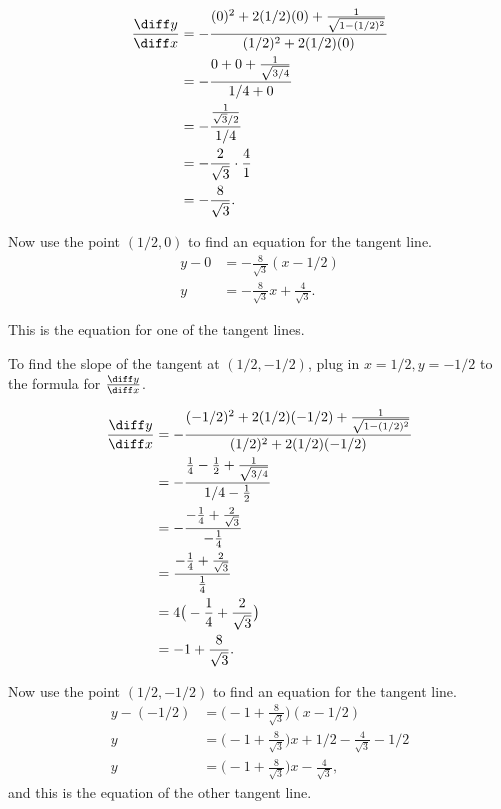 \begin{enumerate}
{\begin{align*}
\frac{\diff y}{\diff x} & = -\frac{(0)^2+2(1/2)(0) + \frac{1}{\sqrt{1-(1/2)^2}}}{(1/2)^2+2(1/2)(0)} \\
& = -\frac{0+0+\frac{1}{\sqrt{3/4}}}{1/4 + 0} \\
& = -\frac{\frac{1}{\sqrt{3}/2}}{1/4} \\
& = -\frac{2}{\sqrt{3}}\cdot \frac{4}{1} \\
& = -\frac{8}{\sqrt{3}}.
\end{align*}

Now use the point $(1/2,0)$ to find an equation for the tangent line.  
\begin{align*}
y - 0 & = -\frac{8}{\sqrt{3}}(x-1/2) \\
y & = -\frac{8}{\sqrt{3}}x +\frac{4}{\sqrt{3}}.
\end{align*}

This is the equation for one of the tangent lines.  

To find the slope of the tangent at $(1/2,-1/2)$, plug in $x=1/2,y=-1/2$ to the formula for $\frac{\diff y}{\diff x}$.  

\begin{align*}
\frac{\diff y}{\diff x} & = -\frac{(-1/2)^2+2(1/2)(-1/2) + \frac{1}{\sqrt{1-(1/2)^2}}}{(1/2)^2+2(1/2)(-1/2)} \\
& = -\frac{\frac{1}{4}-\frac{1}{2}+\frac{1}{\sqrt{3/4}}}{1/4 -\frac{1}{2}} \\
& = -\frac{-\frac{1}{4}+\frac{2}{\sqrt{3}}}{-\frac{1}{4}} \\
& = \frac{-\frac{1}{4}+\frac{2}{\sqrt{3}}}{\frac{1}{4}} \\
& = 4\big(-\frac{1}{4}+\frac{2}{\sqrt{3}}\big) \\
& = -1 + \frac{8}{\sqrt{3}}.
\end{align*}

Now use the point $(1/2,-1/2)$ to find an equation for the tangent line.  
\begin{align*}
y - (-1/2) & = \Big(-1 + \frac{8}{\sqrt{3}}\Big)(x-1/2) \\
y  & = \Big(-1 + \frac{8}{\sqrt{3}}\Big)x +1/2 - \frac{4}{\sqrt{3}} - 1/2 \\
y  & = \Big(-1 + \frac{8}{\sqrt{3}}\Big)x - \frac{4}{\sqrt{3}},
\end{align*}
and this is the equation of the other tangent line.  
}%


\end{enumerate}

